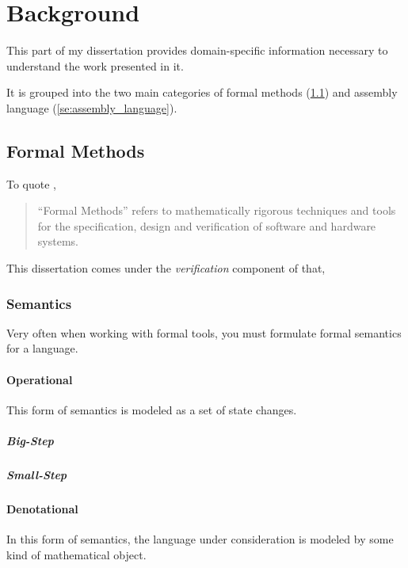 \chapter{Background}\label{ch:background}
This part of my dissertation provides domain-specific information necessary to understand
the work presented in it.

It is grouped into the two main categories of
formal methods (\cref{se:formal_methods})
and assembly language (\cref{se:assembly_language}).

\section{Formal Methods}\label{se:formal_methods}
To quote \textcite{butler:fm},
\begin{quote}
  ``Formal Methods''
  refers to mathematically rigorous techniques and tools
  for the specification, design and verification of software and hardware systems.
\end{quote}
This dissertation comes under the \emph{verification} component of that,%

\subsection{Semantics}
Very often when working with formal tools, you must formulate formal semantics
for a language.

\Textcite{schmidt2003pls}

\subsubsection{Operational}
This form of semantics is modeled as a set of state changes.

\paragraph{Big-Step}
\paragraph{Small-Step}

\subsubsection{Denotational}
In this form of semantics, the language under consideration
is modeled by some kind of mathematical object.

